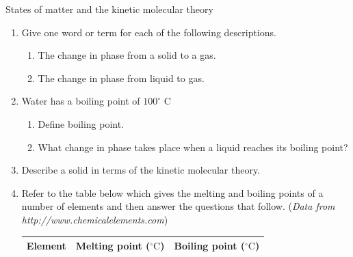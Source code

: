             \begin{eocexercises}{States of matter and the kinetic molecular theory}
            \nopagebreak \noindent
\label{m38730*id311490}\begin{enumerate}[noitemsep, label=\textbf{\arabic*}. ] 
            \label{m38730*uid87}\item Give one word or term for each of the following 
descriptions.
\label{m38730*id311506}\begin{enumerate}[noitemsep, label=\textbf{\alph*}. ] 
            \label{m38730*uid88}\item The change in phase from a solid to a gas.
\label{m38730*uid89}\item The change in phase from liquid to gas.
\end{enumerate}
                \label{m38730*uid103}\item Water has a boiling point of $100 ^{\circ} \text{ C}$
\label{m38730*id311744}\begin{enumerate}[noitemsep, label=\textbf{\alph*}. ] 
            \label{m38730*uid104}\item Define boiling point.
\label{m38730*uid105}\item What change in phase takes place when a liquid reaches its boiling point?
\end{enumerate}
\label{m38730*id762}\item Describe a solid in terms of the kinetic molecular theory. \newline
            \label{m38730*uid108}\item Refer to the table below which gives the melting and 
boiling points of a number of elements and then answer the questions that follow. (\textsl{Data from http://www.chemicalelements.com})
          \begin{table}[H]
        \begin{center}
      \label{m38730*id311817}
      \begin{tabular}{|l|l|l|}\hline
\textbf{Element} & \textbf{Melting point ($^{\circ} \text{C}$)} & \textbf{Boiling point ($^{\circ} \text{C}$)} \\ \hline

\end{tabular}
\end{center}
\end{table}
\end{enumerate}
\end{eocexercises}
